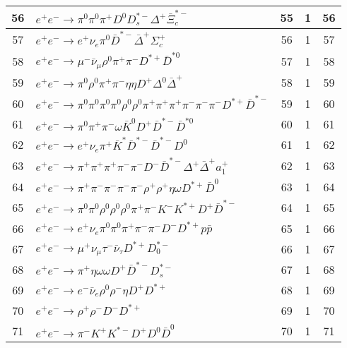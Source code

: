 \documentclass[landscape]{article}
\begin{document}
\begin{table}[htbp!]
\begin{tabular}{|c|>{\centering}p{18cm}|c|c|c|}
\hline
56 & $ e^{+} e^{-} \rightarrow \pi^{0} \pi^{0} \pi^{+} D^{0} D_{s}^{*-} \Delta^{+} \bar{\Xi}_{c}^{*-} $ & 55 & 1 & 56 \\
\hline
57 & $ e^{+} e^{-} \rightarrow e^{+} \nu_{e} \pi^{0} \bar{D}^{*-} \bar{\Delta}^{+} \Sigma_{c}^{+} $ & 56 & 1 & 57 \\
\hline
58 & $ e^{+} e^{-} \rightarrow \mu^{-} \bar{\nu}_{\mu} \rho^{0} \pi^{+} \pi^{-} D^{*+} \bar{D}^{*0} $ & 57 & 1 & 58 \\
\hline
59 & $ e^{+} e^{-} \rightarrow \pi^{0} \rho^{0} \pi^{+} \pi^{-} \eta \eta D^{+} \Delta^{0} \bar{\Delta}^{+} $ & 58 & 1 & 59 \\
\hline
60 & $ e^{+} e^{-} \rightarrow \pi^{0} \pi^{0} \pi^{0} \pi^{0} \rho^{0} \rho^{0} \pi^{+} \pi^{+} \pi^{+} \pi^{-} \pi^{-} \pi^{-} D^{*+} \bar{D}^{*-} $ & 59 & 1 & 60 \\
\hline
61 & $ e^{+} e^{-} \rightarrow \pi^{0} \pi^{+} \pi^{-} \omega \bar{K}^{0} D^{+} \bar{D}^{*-} \bar{D}^{*0} $ & 60 & 1 & 61 \\
\hline
62 & $ e^{+} e^{-} \rightarrow e^{+} \nu_{e} \pi^{+} \bar{K}^{*} \bar{D}^{*-} \bar{D}^{*-} D^{0} $ & 61 & 1 & 62 \\
\hline
63 & $ e^{+} e^{-} \rightarrow \pi^{+} \pi^{+} \pi^{+} \pi^{-} \pi^{-} D^{-} \bar{D}^{*-} \Delta^{+} \bar{\Delta}^{+} a_{1}^{+} $ & 62 & 1 & 63 \\
\hline
64 & $ e^{+} e^{-} \rightarrow \pi^{+} \pi^{-} \pi^{-} \pi^{-} \pi^{-} \rho^{+} \rho^{+} \eta \omega D^{*+} \bar{D}^{0} $ & 63 & 1 & 64 \\
\hline
65 & $ e^{+} e^{-} \rightarrow \pi^{0} \pi^{0} \rho^{0} \rho^{0} \rho^{0} \pi^{+} \pi^{-} K^{-} K^{*+} D^{+} \bar{D}^{*-} $ & 64 & 1 & 65 \\
\hline
66 & $ e^{+} e^{-} \rightarrow e^{+} \nu_{e} \pi^{0} \pi^{0} \pi^{+} \pi^{-} \pi^{-} D^{-} D^{*+} p \bar{p} $ & 65 & 1 & 66 \\
\hline
67 & $ e^{+} e^{-} \rightarrow \mu^{+} \nu_{\mu} \tau^{-} \bar{\nu}_{\tau} D^{*+} D_{0}^{*-} $ & 66 & 1 & 67 \\
\hline
68 & $ e^{+} e^{-} \rightarrow \pi^{+} \eta \omega \omega D^{+} \bar{D}^{*-} D_{s}^{*-} $ & 67 & 1 & 68 \\
\hline
69 & $ e^{+} e^{-} \rightarrow e^{-} \bar{\nu}_{e} \rho^{0} \rho^{-} \eta D^{+} D^{*+} $ & 68 & 1 & 69 \\
\hline
70 & $ e^{+} e^{-} \rightarrow \rho^{+} \rho^{-} D^{-} D^{*+} $ & 69 & 1 & 70 \\
\hline
71 & $ e^{+} e^{-} \rightarrow \pi^{-} K^{+} K^{*-} D^{+} D^{0} \bar{D}^{0} $ & 70 & 1 & 71 \\

\end{tabular}
\end{table}
\end{document}

